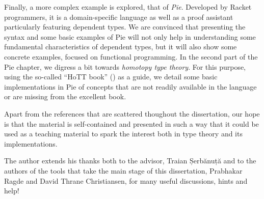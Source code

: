 Finally, a more complex example is explored, that of \emph{Pie}. Developed by
Racket programmers, it is a domain-specific language as well as a proof
assistant particularly featuring dependent types. We are convinced that
presenting the syntax and some basic examples of Pie will not only help in
understanding some fundamental characteristics of dependent types, but it will
also show some concrete examples, focused on functional programming. In the second
part of the Pie chapter, we digress a bit towards \emph{homotopy type %
  theory}. For this purpose, using the so-called ``HoTT book'' (\cite{hott}) as
a guide, we detail some basic implementations in Pie of concepts that are not
readily available in the language or are missing from the excellent
\cite{typer} book.

Apart from the references that are scattered thoughout the dissertation, our
hope is that the material is self-contained and presented in such a way that
it could be used as a teaching material to spark the interest both in type
theory and its implementations.

The author extends his thanks both to the advisor,
Traian Șerbănuță and to the authors of the tools that take
the main stage of this dissertation, Prabhakar Ragde and David Thrane Christiansen,
for many useful discussions, hints and help!

